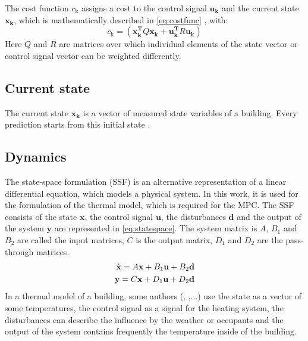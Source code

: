     The cost function $c_\text{k}$ assigns a cost to the control signal $\mathbf{u_k}$ and the current state $\mathbf{x_k}$, which is mathematically described in
    \autoref{eq:costfunc}
    , with:
    \begin{equation}
    \label{eq:c_k}
    c_\text{k} = (\mathbf{x_k^T}Q\mathbf{x_k}+\mathbf{u_k^T}R\mathbf{u_k})
    \end{equation}
    Here $Q$ and $R$ are matrices over which individual elements of the state vector or control signal vector can be weighted differently.  
    \cite{Kouvaritakis.2016}

\subsection{Current state}
\label{subsection:currentstate}

    The current state $\mathbf{x_k}$ is a vector of measured state variables of a building. Every prediction starts from this initial state \cite{Oldewurtel.2012}.
    
\subsection{Dynamics}
\label{subsection:dynamics}
    
    The state-space formulation (SSF) is an alternative representation of a linear differential equation, which models a physical system. In this work, it is used for the formulation of the thermal model, which is required for the MPC. The SSF consists of the state $\textbf{x}$, the control signal $\textbf{u}$, the disturbances $\textbf{d}$ and the output of the system $\textbf{y}$ are represented in \autoref{eq:statespace}. The system matrix is $A$, $B_1$ and $B_2$ are called the input matrices, $C$ is the output matrix, $D_1$ and $D_2$ are the pass-through matrices.  
    \begin{align}
    \label{eq:statespace}
    \dot{\textbf{x}}=A\textbf{x}+B_1\textbf{u}+B_2\textbf{d}\\
    \textbf{y}=C\textbf{x}+D_1\textbf{u}+D_2\textbf{d} \notag
    \end{align}
    In a thermal model of a building, some authors (\cite{Hazyuk.2012}, \cite{Siroky.2011},...) use the state as a vector of some temperatures, the control signal as a signal for the heating system, the disturbances can describe the influence by the weather or occupants and the output of the system contains frequently the temperature inside of the building.
    


